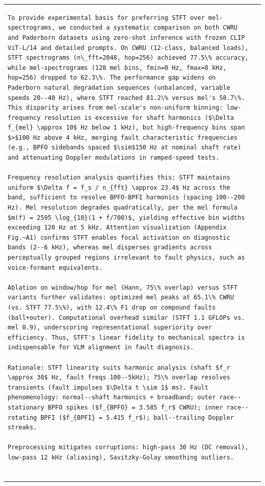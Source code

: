 \begin{table}[htbp]
\begin{tabular}{@{}ll@{}}
\begin{verbatim}
To provide experimental basis for preferring STFT over mel-spectrograms, we conducted a systematic comparison on both CWRU and Paderborn datasets using zero-shot inference with frozen CLIP ViT-L/14 and detailed prompts. On CWRU (12-class, balanced loads), STFT spectrograms (n\_fft=2048, hop=256) achieved 77.5\% accuracy, while mel-spectrograms (128 mel bins, fmin=0 Hz, fmax=8 kHz, hop=256) dropped to 62.3\%. The performance gap widens on Paderborn natural degradation sequences (unbalanced, variable speeds 20--40 Hz), where STFT reached 81.2\% versus mel's 58.7\%. This disparity arises from mel-scale's non-uniform binning: low-frequency resolution is excessive for shaft harmonics ($\Delta f_{mel} \approx 10$ Hz below 1 kHz), but high-frequency bins span $>$100 Hz above 4 kHz, merging fault characteristic frequencies (e.g., BPFO sidebands spaced $\sim$150 Hz at nominal shaft rate) and attenuating Doppler modulations in ramped-speed tests.

Frequency resolution analysis quantifies this: STFT maintains uniform $\Delta f = f_s / n_{fft} \approx 23.4$ Hz across the band, sufficient to resolve BPFO-BPFI harmonics (spacing 100--200 Hz). Mel resolution degrades quadratically, per the mel formula $m(f) = 2595 \log_{10}(1 + f/700)$, yielding effective bin widths exceeding 120 Hz at 5 kHz. Attention visualization (Appendix Fig.~A1) confirms STFT enables focal activation on diagnostic bands (2--6 kHz), whereas mel disperses gradients across perceptually grouped regions irrelevant to fault physics, such as voice-formant equivalents.

Ablation on window/hop for mel (Hann, 75\% overlap) versus STFT variants further validates: optimized mel peaks at 65.1\% CWRU (vs. STFT 77.5\%), with 12.4\% F1 drop on compound faults (ball+outer). Computational overhead similar (STFT 1.1 GFLOPs vs. mel 0.9), underscoring representational superiority over efficiency. Thus, STFT's linear fidelity to mechanical spectra is indispensable for VLM alignment in fault diagnosis.

Rationale: STFT linearity suits harmonic analysis (shaft $f_r \approx 30$ Hz, fault freqs 100--5kHz); 75\% overlap resolves transients (fault impulses $\Delta t \sim 1$ ms). Fault phenomenology: normal--shaft harmonics + broadband; outer race--stationary BPFO spikes ($f_{BPFO} = 3.585 f_r$ CWRU); inner race--rotating BPFI ($f_{BPFI} = 5.415 f_r$); ball--trailing Doppler streaks.

Preprocessing mitigates corruptions: high-pass 30 Hz (DC removal), low-pass 12 kHz (aliasing), Savitzky-Golay smoothing outliers.


\end{verbatim}
\end{tabular}
\end{table}
